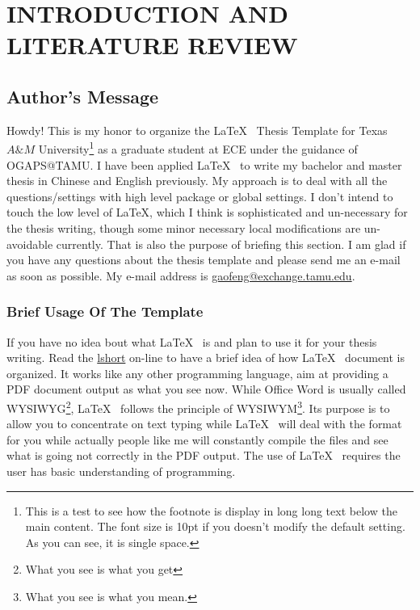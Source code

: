 \chapter[INTRODUCTION AND LITERATURE REVIEW]{INTRODUCTION AND \\  LITERATURE REVIEW}

\section{Author's Message}

Howdy! This is my honor to organize the \LaTeX ~ Thesis Template for Texas $A\&M$ University\footnote{This is a test to see how the footnote is display in long long text below the main content. The font size is 10pt if you doesn't modify the default setting. As you can see, it is single space.} as a graduate student at ECE under the guidance of OGAPS@TAMU. I have been applied \LaTeX~ to write my bachelor and master thesis in Chinese and English previously. My approach is to deal with all the questions/settings with high level package or global settings. I don't intend to touch the low level of \LaTeX, which I think is sophisticated and un-necessary for the thesis writing, though some minor necessary local modifications are un-avoidable currently. That is also the purpose of briefing this section. I am glad if you have any questions about the thesis template and please send me an e-mail as soon as possible. My e-mail address is \href{gaofeng@exchange.tamu.edu}{gaofeng@exchange.tamu.edu}.

\subsection{Brief Usage Of The Template}
If you have no idea bout what \LaTeX ~ is and plan to use it for your thesis writing. Read the \href{http://www.ctan.org/tex-archive/info/lshort/english/}{lshort} on-line to have a brief idea of how \LaTeX ~ document is organized. It works like any other programming language, aim at providing a PDF document output as what you see now. While Office Word is usually called WYSIWYG\footnote{What you see is what you get}, \LaTeX~ follows the principle of WYSIWYM\footnote{What you see is what you mean.}. Its purpose is to allow you to concentrate on text typing while \LaTeX~ will deal with the format for you while actually people like me will constantly compile the files and see what is going not correctly in the PDF output. The use of \LaTeX~ requires the user has basic understanding of programming. 

